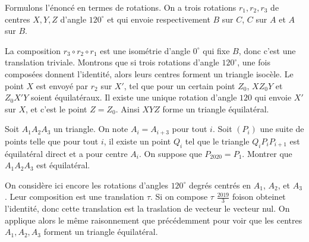 \begin{sol}
\begin{center}
\end{center}
Formulons l'énoncé en termes de rotations. On a trois rotations $r_1,r_2,r_3$ de centres $X,Y,Z$ d'angle $120^\circ$ et qui envoie respectivement $B$ sur $C$, $C$ sur $A$ et $A$ sur $B$.

\medskip

La composition $r_3\circ r_2\circ r_1$ est une isométrie d'angle $0^\circ$ qui fixe $B$, donc c'est une translation triviale. Montrons que si trois rotations d'angle $120^\circ$, une fois composées donnent l'identité, alors leurs centres forment un triangle isocèle. Le point $X$ est envoyé par $r_2$ sur $X'$, tel que pour un certain point $Z_0$, $XZ_0Y$ et $Z_0X'Y$ soient équilatéraux. Il existe une unique rotation d'angle $120$ qui envoie $X'$ sur $X$, et c'est le point $Z=Z_0$. Ainsi $XYZ$ forme un triangle équilatéral.
\end{sol}

\begin{exo}
Soit $A_1A_2A_3$ un triangle. On note $A_i = A_{i+3}$ pour tout $i$. Soit $(P_i)$ une suite de points
telle que pour tout $i$, il existe un point $Q_i$ tel que le triangle $Q_iP_iP_{i+1}$ est équilatéral direct et a pour centre $A_i$.
On suppose que $P_{2020} = P_1$. Montrer que $A_1A_2A_3$ est équilatéral.
\end{exo}

\begin{sol}
On considère ici encore les rotations d'angles $120^\circ$ degrés centrés en $A_1$, $A_2$, et $A_3$. Leur composition est une translation $\tau$. Si on compose $\tau$ $\frac{2019}{3}$ foison obteinet l'identité, donc cette translation est la traslation de vecteur le vecteur nul. On applique alors le même raisonnement que précédemment pour voir que les centres $A_1,A_2,A_3$ forment un triangle équilatéral.
\end{sol}


